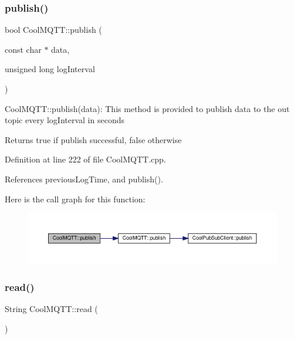 \subsubsection{\texorpdfstring{publish()}{publish()}\hspace{0.1cm}{\footnotesize\ttfamily [2/2]}}
{\footnotesize\ttfamily bool Cool\+M\+Q\+T\+T\+::publish (\begin{DoxyParamCaption}\item[{const char $\ast$}]{data,  }\item[{unsigned long}]{log\+Interval }\end{DoxyParamCaption})}

Cool\+M\+Q\+T\+T\+::publish(data)\+: This method is provided to publish data to the out topic every log\+Interval in seconds

\begin{DoxyReturn}{Returns}
true if publish successful, false otherwise 
\end{DoxyReturn}


Definition at line 222 of file Cool\+M\+Q\+T\+T.\+cpp.



References previous\+Log\+Time, and publish().

Here is the call graph for this function\+:
\nopagebreak
\begin{figure}[H]
\begin{center}
\leavevmode
\includegraphics[width=350pt]{d0/dd0/class_cool_m_q_t_t_a613c5e3927ae85bb94fbf648d84d8780_cgraph}
\end{center}
\end{figure}
\mbox{\label{class_cool_m_q_t_t_ae3c18f6ae9723746d32765f1c8f176ca}} 
\subsubsection{\texorpdfstring{read()}{read()}}
{\footnotesize\ttfamily String Cool\+M\+Q\+T\+T\+::read (\begin{DoxyParamCaption}{ }\end{DoxyParamCaption})}

